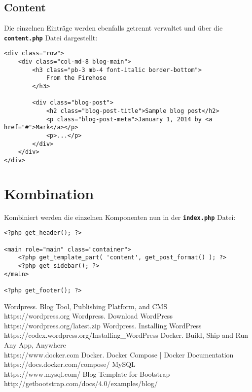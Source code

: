 \documentclass[minted]{school}
\begin{document}
\subsection{Content}
Die einzelnen Einträge werden ebenfalls getrennt verwaltet und über die \textbf{\texttt{content.php}} Datei dargestellt:

\begin{verbatim}
<div class="row">
    <div class="col-md-8 blog-main">
        <h3 class="pb-3 mb-4 font-italic border-bottom">
            From the Firehose
        </h3>

        <div class="blog-post">
            <h2 class="blog-post-title">Sample blog post</h2>
            <p class="blog-post-meta">January 1, 2014 by <a href="#">Mark</a></p>
            <p>...</p>
        </div>
    </div>
</div>
\end{verbatim}

\newpage
\section{Kombination}
Kombiniert werden die einzelnen Komponenten nun in der \textbf{\texttt{index.php}} Datei:

\begin{verbatim}
<?php get_header(); ?>

<main role="main" class="container">
    <?php get_template_part( 'content', get_post_format() ); ?>
    <?php get_sidebar(); ?>
</main>

<?php get_footer(); ?>
\end{verbatim}


\newpage
\begin{thebibliography}{9}
 Wordpress. Blog Tool, Publishing Platform, and CMS \\ https://wordpress.org
 Wordpress. Download WordPress \\ https://wordpress.org/latest.zip
 Wordpress. Installing WordPress \\ https://codex.wordpress.org/Installing\_WordPress
 Docker. Build, Ship and Run Any App, Anywhere \\ https://www.docker.com
 Docker. Docker Compose | Docker Documentation \\ https://docs.docker.com/compose/
 MySQL \\ https://www.mysql.com/
 Blog Template for Bootstrap \\ http://getbootstrap.com/docs/4.0/examples/blog/
\end{thebibliography}

\end{document}
